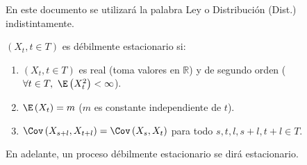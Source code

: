 En este documento se utilizar\'{a} la palabra Ley o Distribuci\'{o}n (Dist.) indistintamente.

\begin{definicion}$(X_{t}, t\in T)$ es d\'{e}bilmente estacionario si:
\begin{enumerate}
\item $(X_{t}, t\in T)$ es real (toma valores en $\mathbb{R}$) y de segundo orden ($ \forall t\in T,\ \E\left( X_{t}^{2} \right)<\infty$).
\item $\E\left( X_{t} \right)=m$ ($m$ es constante independiente de $t$).
\item $\Cov\left( X_{s+l},X_{t+l} \right)=\Cov\left( X_{s},X_{t} \right)$ para todo $ s,t,l,s+l,t+l\in T$.
\end{enumerate}
\end{definicion}

\begin{observacion}
  En adelante, un proceso d\'{e}bilmente estacionario se dir\'{a} estacionario.
\end{observacion}

